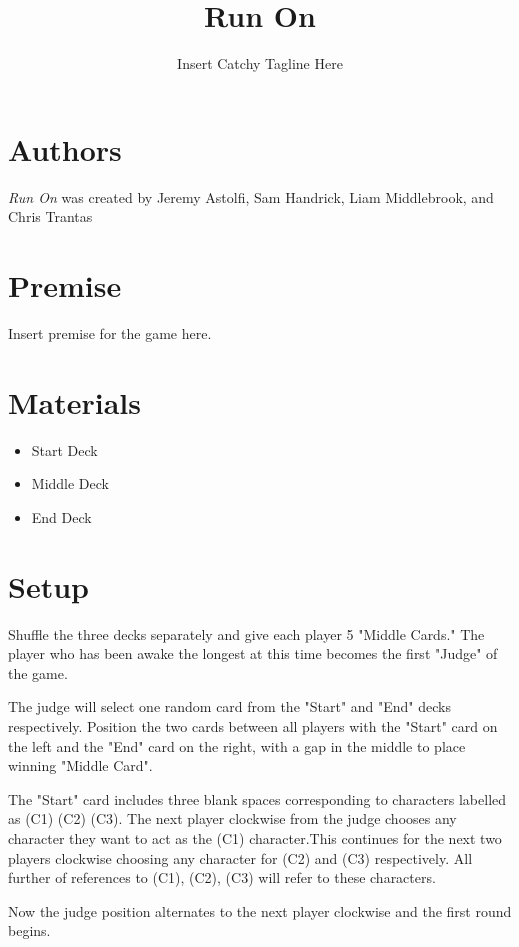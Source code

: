 \documentclass[twocolumn]{article}
\title{Run On}
\author{Insert Catchy Tagline Here}
\date{}
\begin{document}
\maketitle

\section*{Authors}

\emph{Run On} was created by Jeremy Astolfi, Sam Handrick, Liam Middlebrook, and Chris Trantas

\section*{Premise}

Insert premise for the game here.

\section*{Materials}

\begin{itemize}
	\item Start Deck
	\item Middle Deck
	\item End Deck
\end{itemize}

\section*{Setup}

Shuffle the three decks separately and give each player 5 "Middle Cards." The player who has been awake the longest at this time becomes the first "Judge" of the game.

The judge will select one random card from the "Start" and "End" decks respectively. Position the two cards between all players with the "Start" card on the left and the "End" card on the right, with a gap in the middle to place winning "Middle Card".

The "Start" card includes three blank spaces corresponding to characters labelled as (C1) (C2) (C3). The next player clockwise from the judge chooses any character they want to act as the (C1) character.This continues for the next two players clockwise choosing any character for (C2) and (C3) respectively. All further of references to (C1), (C2), (C3) will refer to these characters.

Now the judge position alternates to the next player clockwise and the first round begins.
\end{document}
